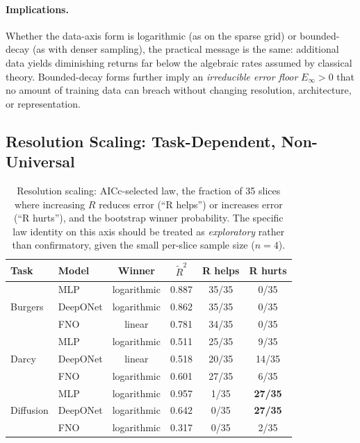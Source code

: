 \documentclass[11pt]{article}
\newcommand{\Einf}{E_\infty}
\begin{document}
\paragraph{Implications.}
Whether the data-axis form is logarithmic (as on the sparse grid) or
bounded-decay (as with denser sampling), the practical message is the
same: additional data yields diminishing returns far below the algebraic
rates assumed by classical theory. Bounded-decay forms further imply an
\emph{irreducible error floor} $\Einf > 0$ that no amount of training
data can breach without changing resolution, architecture, or
representation.


\subsection{Resolution Scaling: Task-Dependent, Non-Universal}
\label{sec:resolution-scaling}

\begin{table}[h]
\centering
\caption{Resolution scaling: AICc-selected law, the fraction of 35
slices where increasing $R$ reduces error (``R helps'') or increases
error (``R hurts''), and the bootstrap winner probability.
The specific law identity on this axis should be treated as
\emph{exploratory} rather than confirmatory, given the small
per-slice sample size ($n=4$).}
\label{tab:res-laws}
\begin{tabular}{@{}llcccc@{}}
\toprule
\textbf{Task} & \textbf{Model} & \textbf{Winner} & $\tilde{R}^2$ &
\textbf{R helps} & \textbf{R hurts} \\
\midrule
\multirow{3}{*}{Burgers}
  & MLP      & logarithmic & 0.887 & 35/35 & 0/35 \\
  & DeepONet & logarithmic & 0.862 & 35/35 & 0/35 \\
  & FNO      & linear      & 0.781 & 34/35 & 0/35 \\
\midrule
\multirow{3}{*}{Darcy}
  & MLP      & logarithmic & 0.511 & 25/35 & 9/35 \\
  & DeepONet & linear      & 0.518 & 20/35 & 14/35 \\
  & FNO      & logarithmic & 0.601 & 27/35 & 6/35 \\
\midrule
\multirow{3}{*}{Diffusion}
  & MLP      & logarithmic & 0.957 & 1/35 & \textbf{27/35} \\
  & DeepONet & logarithmic & 0.642 & 0/35 & \textbf{27/35} \\
  & FNO      & logarithmic & 0.317 & 0/35 & 2/35 \\
\bottomrule
\end{tabular}
\end{table}
\end{document}

